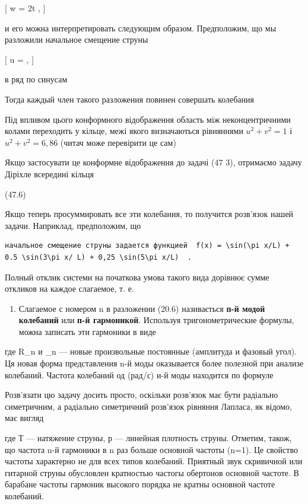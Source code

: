 \documentclass[
  ukrainian,
]{article}
\providecommand{\tightlist}{%
  \setlength{\itemsep}{0pt}\setlength{\parskip}{0pt}}
\begin{document}
{[} w = 2t , {]}

и его можна интерпретировать следующим образом. Предположим, що мы
разложили начальное смещение струны

{[} u = \gamma [(x-s)(x-t)-\gamma^2], {]}

в ряд по синусам

Тогда каждый член такого разложения повинен совершать колебания

Під впливом цього конформного відображення область між неконцентричними
колами переходить у кільце, межі якого визначаються рівняннями
\(u^2 + v^2 = 1\) і \(u^2 + v^2 = 6,86\) (читач може перевірити це сам)

Якщо застосувати це конформне відображення до задачі (47 3), отримаємо
задачу Діріхле всередині кільця

(47.6)

Якщо теперь просуммировать все эти колебания, то получится розв'язок
нашей задачи. Наприклад, предположим, що

\begin{verbatim}
начальное смещение струны задается функцией  f(x) = \sin(\pi x/L) + 0.5 \sin(3\pi x/ L) + 0,25 \sin(5\pi x/L)  .
\end{verbatim}

Полный отклик системи на початкова умова такого вида дорівнює сумме
откликов на каждое слагаемое, т. е.

\begin{enumerate}
\def\labelenumi{\arabic{enumi}.}
\setcounter{enumi}{1}
\tightlist
\item
  Слагаемое с номером n в разложении (20.6) називається \textbf{п-й
  модой колебаний} или \textbf{п-й гармоникой}. Используя
  тригонометрические формулы, можна записать эти гармоники в виде
\end{enumerate}

где R\_n и \delta\_n --- новые произвольные постоянные (амплитуда и
фазовый угол). Ця новая форма представления n-й моды оказывается более
полезной при анализе колебаний. Частота колебаний од (рад/с) и-й моды
находится по формуле

Розв'язати цю задачу досить просто, оскільки розв'язок має бути
радіально симетричним, а радіально симетричний розв'язок рівняння
Лапласа, як відомо, має вигляд

где Т --- натяжение струны, р --- линейная плотность струны. Отметим,
також, що частота n-й гармоники в n раз больше основной частоты (n=1).
Це свойство частоты характерно не для всех типов колебаний. Приятный
звук скривичной или гитарной струны обусловлен кратностью частогы
обертонов основной частоте. В барабане частоты гармоник высокого порядка
не кратны основной частоте колебаний.
\end{document}
